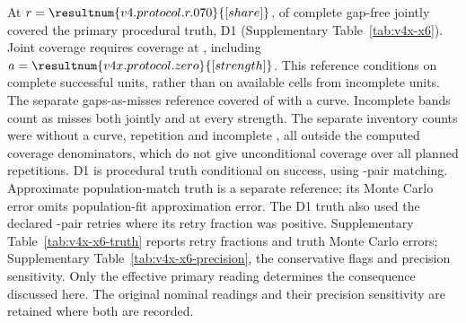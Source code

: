 At $r=\resultnum{v4.protocol.r.070}{[share]}$,  of  complete gap-free  jointly covered the primary procedural truth, D1 (Supplementary Table~\ref{tab:v4x-x6}). %
Joint coverage requires coverage at   , including $a=\resultnum{v4x.protocol.zero}{[strength]}$. This reference conditions on complete successful units, rather than on available cells from incomplete units. %
The separate gaps-as-misses reference covered  of   with a curve. Incomplete bands count as misses both jointly and at every strength. %
The separate inventory counts were   without a curve,  repetition  and  incomplete , all outside the computed coverage denominators, which do not give unconditional coverage over all planned repetitions. %
D1 is procedural truth conditional on success, using -pair matching. Approximate population-match truth is a separate reference; its Monte Carlo error omits population-fit approximation error. %
The D1 truth also used the declared -pair retries where its retry fraction was positive. %
Supplementary Table~\ref{tab:v4x-x6-truth} reports retry fractions and truth Monte Carlo errors; Supplementary Table~\ref{tab:v4x-x6-precision}, the conservative flags and precision sensitivity. Only the effective primary reading determines the consequence discussed here. %
The original nominal readings and their precision sensitivity are retained where both are recorded. %

